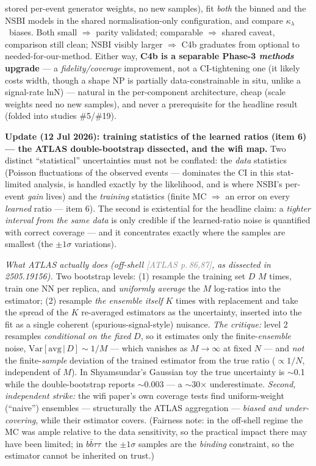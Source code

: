 \documentclass[11pt]{article}
\newcommand{\kl}{\ensuremath{\kappa_\lambda}}
\newcommand{\bbtt}{\ensuremath{b\bar b\tau\tau}}
\newcommand{\pA}[1]{\textcolor{gray}{\small[ATLAS p.\,#1]}}
\begin{document}
\begin{takeaway}
stored per-event generator weights, no new samples), fit \emph{both} the binned and the NSBI models in the
shared normalisation-only configuration, and compare \kl\ biases. Both small $\Rightarrow$ parity validated;
comparable $\Rightarrow$ shared caveat, comparison still clean; NSBI visibly larger $\Rightarrow$ C4b graduates
from optional to needed-for-our-method. Either way, \textbf{C4b is a separable Phase-3 \emph{methods} upgrade}
--- a \emph{fidelity/coverage} improvement, not a CI-tightening one (it likely costs width, though a shape NP is
partially data-constrainable in situ, unlike a signal-rate lnN) --- natural in the per-component architecture,
cheap (scale weights need no new samples), and never a prerequisite for the headline result (folded into
studies \#5/\#19).
\end{takeaway}

\medskip\noindent\textbf{Update (12 Jul 2026): training statistics of the learned ratios (item 6) --- the ATLAS
double-bootstrap dissected, and the wifi map.} Two distinct ``statistical'' uncertainties must not be conflated:
the \emph{data} statistics (Poisson fluctuations of the observed events --- dominates the CI in this stat-limited
analysis, is handled exactly by the likelihood, and is where NSBI's per-event \emph{gain} lives) and the
\emph{training} statistics (finite MC $\Rightarrow$ an error on every \emph{learned} ratio --- item 6). The second
is existential for the headline claim: a \emph{tighter interval from the same data} is only credible if the
learned-ratio noise is quantified with correct coverage --- and it concentrates exactly where the samples are
smallest (the $\pm1\sigma$ variations).

\smallskip\noindent\emph{What ATLAS actually does (off-shell \pA{86,87}, as dissected in 2505.19156).} Two
bootstrap levels: (1) resample the training set $D$ $M$ times, train one NN per replica, and \emph{uniformly
average} the $M$ log-ratios into the estimator; (2) resample \emph{the ensemble itself} $K$ times with
replacement and take the spread of the $K$ re-averaged estimators as the uncertainty, inserted into the fit as a
single coherent (spurious-signal-style) nuisance. \emph{The critique:} level 2 resamples \emph{conditional on the
fixed} $D$, so it estimates only the finite-\emph{ensemble} noise, $\mathrm{Var}[\text{avg}\,|\,D]\sim1/M$ ---
which vanishes as $M\to\infty$ at fixed $N$ --- and \emph{not} the finite-\emph{sample} deviation of the trained
estimator from the true ratio ($\propto1/N$, independent of $M$). In Shyamsundar's Gaussian toy the true
uncertainty is $\sim$0.1 while the double-bootstrap reports $\sim$0.003 --- a $\sim$30$\times$ underestimate.
\emph{Second, independent strike:} the wifi paper's own coverage tests find uniform-weight (``naive'') ensembles
--- structurally the ATLAS aggregation --- \emph{biased and under-covering}, while their estimator covers.
(Fairness note: in the off-shell regime the MC was ample relative to the data sensitivity, so the practical
impact there may have been limited; in \bbtt\ the $\pm1\sigma$ samples are the \emph{binding} constraint, so the
estimator cannot be inherited on trust.)
\end{document}
